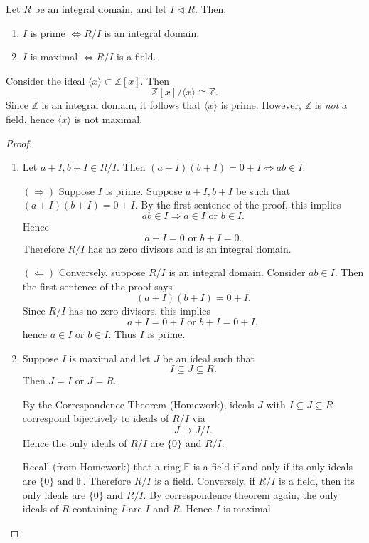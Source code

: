 \begin{proposition}
Let $R$ be an integral domain, and let $I \triangleleft R$. Then:
\begin{enumerate}
    \item $I$ is prime $\Longleftrightarrow R/I$ is an integral domain.
    \item $I$ is maximal $\Longleftrightarrow R/I$ is a field.
\end{enumerate}
\end{proposition}

\begin{example}
Consider the ideal $\langle x \rangle \subset \mathbb{Z}[x]$. Then
\[
\mathbb{Z}[x]/\langle x \rangle \cong \mathbb{Z}.
\]
Since $\mathbb{Z}$ is an integral domain, it follows that $\langle x \rangle$ is prime. However, $\mathbb{Z}$ is \emph{not} a field, hence $\langle x \rangle$ is not maximal.
\end{example}

\begin{proof}
\begin{enumerate}
    \item 
    Let $a+I, b+I \in R/I$. Then
    \(
    (a+I)(b+I) = 0+I
    \Longleftrightarrow
    ab \in I.
    \)

    $(\Rightarrow)$ Suppose $I$ is prime. Suppose $a+I, b +I$ be such that $(a+I)(b+I) = 0 +I$. By the first sentence of the proof, this implies
    \[
    ab \in I \Longrightarrow a \in I \text{ or } b \in I.
    \]
    Hence
    \[
    a+I=0 \text{ or } b+I=0.
    \]
    Therefore $R/I$ has no zero divisors and is an integral domain.

    $(\Leftarrow)$ Conversely, suppose $R/I$ is an integral domain. Consider $ab \in I$. Then the first sentence of the proof says
    \[
    (a+I)(b+I)=0 +I.
    \]
    Since $R/I$ has no zero divisors, this implies
    \[
    a+I=0+I \text{ or } b+I=0+I,
    \]
    hence $a \in I$ or $b \in I$. Thus $I$ is prime.

    \item 
    Suppose $I$ is maximal and let $J$ be an ideal such that
    \[
    I \subseteq J \subseteq R.
    \]
    Then $J = I$ or $J = R$.

    By the Correspondence Theorem (Homework), ideals $J$ with $I \subseteq J \subseteq R$ correspond bijectively to ideals of $R/I$ via
    \[
    J \longmapsto J/I.
    \]
    Hence the only ideals of $R/I$ are $\{0\}$ and $R/I$. 

    Recall (from Homework) that a ring $\mathbb{F}$ is a field if and only if its only ideals are $\{0\}$ and $\mathbb{F}$. Therefore $R/I$ is a field. Conversely, if $R/I$ is a field, then its only ideals are $\{0\}$ and $R/I$. By correspondence theorem again, the only ideals of $R$ containing $I$ are $I$ and $R$. Hence $I$ is maximal.
\end{enumerate}
\end{proof}

